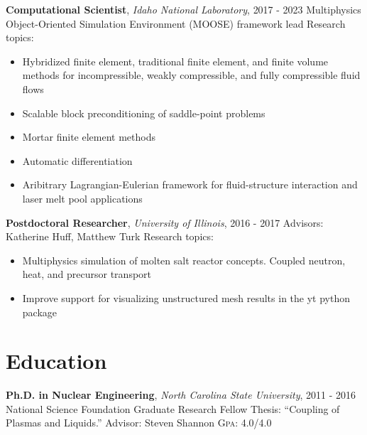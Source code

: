 \documentclass[a4paper,10pt]{article} %
\begin{document}
\textbf{Computational Scientist}, \textit{Idaho National Laboratory}, \textsc{2017 - 2023}\newline
\hspace*{0.5em}Multiphysics Object-Oriented Simulation Environment (MOOSE) framework lead\newline
\hspace*{0.5em}Research topics:
  \begin{itemize}
  \item Hybridized finite element, traditional finite element, and finite volume methods for incompressible, weakly compressible, and fully compressible fluid flows
  \item Scalable block preconditioning of saddle-point problems
  \item Mortar finite element methods
  \item Automatic differentiation
  \item Aribitrary Lagrangian-Eulerian framework for fluid-structure interaction and laser melt pool applications
  \end{itemize}


\textbf{Postdoctoral Researcher}, \textit{University of Illinois}, \textsc{2016 - 2017}\newline
\hspace*{0.5em}Advisors: Katherine Huff, Matthew Turk\newline
\hspace*{0.5em}Research topics:
  \begin{itemize}
  \item Multiphysics simulation of molten salt reactor concepts. Coupled neutron, heat, and precursor transport
  \item Improve support for visualizing unstructured mesh results in the yt python package
  \end{itemize}


\section{Education}

\textbf{Ph.D. in Nuclear Engineering}, \textit{North Carolina State University}, \textsc{2011 - 2016}\newline
\hspace*{0.5em}National Science Foundation Graduate Research Fellow\newline
\hspace*{0.5em}Thesis: ``Coupling of Plasmas and Liquids.''\newline
\hspace*{0.5em}Advisor: Steven Shannon\newline
\hspace*{0.5em}\textsc{Gpa}: 4.0/4.0\newline
\end{document}
